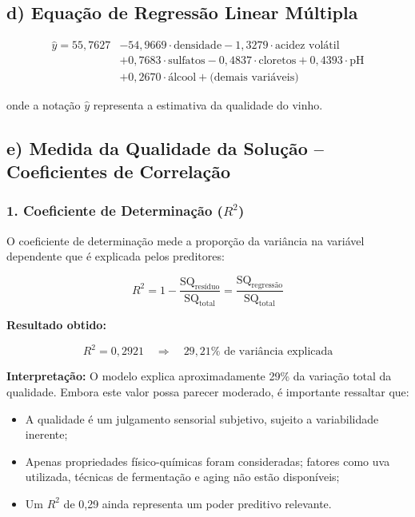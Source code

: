 \documentclass[12pt,a4paper]{article}
\begin{document}
\subsection*{d) Equação de Regressão Linear Múltipla}

\begin{equation}
\boxed{\begin{aligned}
\hat{y} = 55,7627 &- 54,9669 \cdot \text{densidade} - 1,3279 \cdot \text{acidez volátil} \\
&+ 0,7683 \cdot \text{sulfatos} - 0,4837 \cdot \text{cloretos} + 0,4393 \cdot \text{pH} \\
&+ 0,2670 \cdot \text{álcool} + \text{(demais variáveis)}
\end{aligned}}
\end{equation}

\noindent onde a notação $\hat{y}$ representa a estimativa da qualidade do vinho.

\subsection*{e) Medida da Qualidade da Solução -- Coeficientes de Correlação}

\subsubsection*{1. Coeficiente de Determinação ($R^2$)}

O coeficiente de determinação mede a proporção da variância na variável dependente que é explicada pelos preditores:

\begin{equation}
R^2 = 1 - \frac{\text{SQ}_{\text{resíduo}}}{\text{SQ}_{\text{total}}} = \frac{\text{SQ}_{\text{regressão}}}{\text{SQ}_{\text{total}}}
\end{equation}

\textbf{Resultado obtido:}

\begin{equation}
R^2 = 0,2921 \quad \Rightarrow \quad \boxed{29,21\% \text{ de variância explicada}}
\end{equation}

\textbf{Interpretação:} O modelo explica aproximadamente 29\% da variação total da qualidade. Embora este valor possa parecer moderado, é importante ressaltar que:

\begin{itemize}
  \item A qualidade é um julgamento sensorial subjetivo, sujeito a variabilidade inerente;
  \item Apenas propriedades físico-químicas foram consideradas; fatores como uva utilizada, técnicas de fermentação e aging não estão disponíveis;
  \item Um $R^2$ de 0,29 ainda representa um poder preditivo relevante.
\end{itemize}
\end{document}
